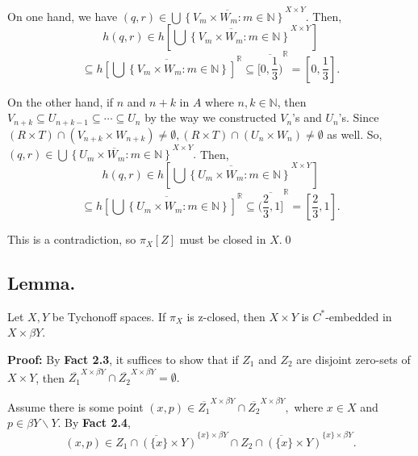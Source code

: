 \documentclass{article}
\begin{document}
			  On one hand, we have $(q,r)\in \overline{\bigcup\left\{V_m\times W_m: m\in \mathbb{N}\right\}}^{X\times Y}.$ Then, 
			  $$h(q,r)\in h\left[\overline{\bigcup\left\{V_m\times W_m: m\in \mathbb{N}\right\}}^{X\times Y}\right] $$
			  $$\subseteq \overline{h\left[\bigcup\left\{V_m\times W_m: m\in \mathbb{N}\right\}\right]}^{\mathbb{R}}\subseteq \overline{[0,\frac{1}{3})}^\mathbb{R}=[0,\frac{1}{3}].$$

			  \vskip 20pt

			  On the other hand, if $n$ and $n+k$ in $A$ where $n,k\in \mathbb{N}$, then $V_{n+k}\subseteq U_{n+k-1}\subseteq \cdots \subseteq U_n$ by the way we constructed $V_n$'s and $U_n$'s. Since $(R\times T)\cap (V_{n+k}\times W_{n+k})\neq \emptyset, (R\times T)\cap (U_n\times W_n) \neq \emptyset$ as well. 
			  \vskip 10pt
			  So, $(q,r)\in \overline{\bigcup\left\{U_m\times W_m: m\in \mathbb{N}\right\}}^{X\times Y}.$ Then, 
			  $$h(q,r)\in h\left[\overline{\bigcup\left\{U_m\times W_m: m\in \mathbb{N}\right\}}^{X\times Y}\right] $$
			  $$\subseteq \overline{h\left[\bigcup\left\{U_m\times W_m: m\in \mathbb{N}\right\}\right]}^{\mathbb{R}}\subseteq \overline{(\frac{2}{3},1]}^\mathbb{R}=[\frac{2}{3}, 1].$$


				  \vskip 15pt

				  This is a contradiction, so $\pi_X[Z]$ must be closed in $X$.\qed




				  \vskip 40pt







				  \subsection{Lemma.}  Let $X,Y$ be Tychonoff spaces. If $\pi_X$ is z-closed, then $X\times Y$ is $C^*$-embedded in $X\times \beta Y$.


			  \vskip 15pt


			  \textbf{Proof:} By \textbf{Fact 2.3}, it suffices to show that if $Z_1$ and $Z_2$ are disjoint zero-sets of $X\times Y$, then $\overline{Z_1}^{X\times \beta Y} \cap \overline{Z_2}^{X\times \beta Y}=\emptyset.$

			  \vskip 15pt

			  Assume there is some point $(x,p)\in \overline{Z_1}^{X\times \beta Y}\cap \overline{Z_2}^{X\times \beta Y},$ where $x\in X$ and $p\in \beta Y\backslash Y$. By \textbf{Fact 2.4}, $$(x,p)\in \overline{Z_1\cap (\{x\}\times Y)}^{\{x\}\times \beta Y} \cap \overline{Z_2\cap (\{x\}\times Y)}^{\{x\}\times \beta Y}.$$
\end{document}
